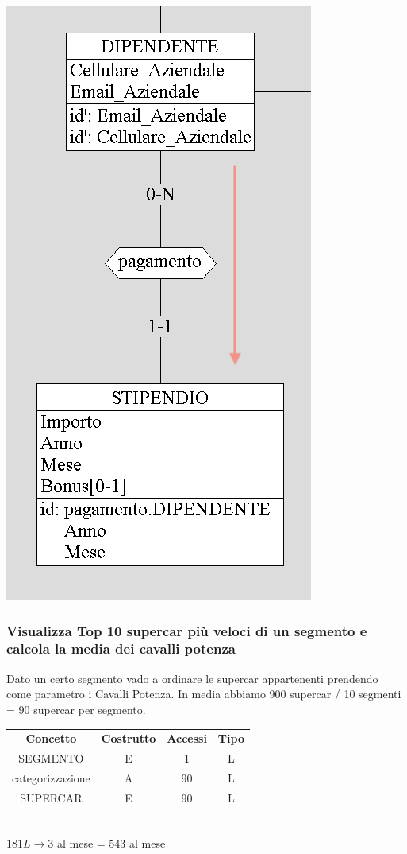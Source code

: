 \documentclass[11pt]{article}
\begin{document}
\begin{center}
    \includegraphics[scale=0.53]{images/navigationSchemes/bonusDipendente.png}
\end{center}

\subsubsection{Visualizza Top 10 supercar più veloci di un segmento e calcola la
media dei cavalli potenza}

Dato un certo segmento vado a ordinare le supercar appartenenti prendendo come
parametro i Cavalli Potenza. In media abbiamo 900 supercar / 10 segmenti = 90
supercar per segmento.

\begin{table}[H]
    \centering
    \begin{tabular}{c c c c }
        \rowcolor{red!20!}
        \textbf{Concetto} & \textbf{Costrutto} & \textbf{Accessi} &
        \textbf{Tipo}\\
        SEGMENTO & E & 1 & L \\
        categorizzazione & A & 90 & L \\
        SUPERCAR & E & 90 & L \\
    \end{tabular}\\
    \( 181L  \rightarrow  3 \) al mese = \( 543 \) al mese
\end{table}
\end{document}
